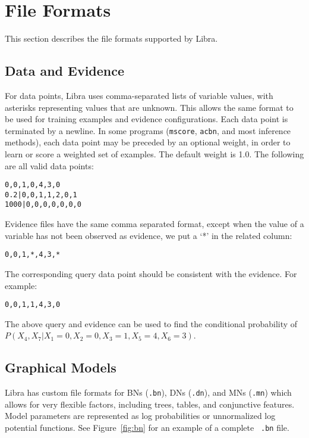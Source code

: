 \documentclass[11pt]{article}
\begin{document}
\section{File Formats}
\label{sec:fileformats}

This section describes the file formats supported by Libra.

\subsection{Data and Evidence}

For data points, Libra uses comma-separated lists of variable values,
with asterisks representing values that are unknown.  This allows the
same format to be used for training examples and evidence
configurations.  Each data point is terminated by a newline.  In some
programs ({\tt mscore}, {\tt acbn}, and most inference
methods), each data point may be preceded by an optional weight, in
order to learn or score a weighted set of examples.  The default
weight is 1.0.  The following are all valid data points:
\begin{verbatim}
0,0,1,0,4,3,0
0.2|0,0,1,1,2,0,1
1000|0,0,0,0,0,0,0
\end{verbatim}
Evidence files have the same comma separated format, except when the
value of a variable has not been observed as evidence, we put a `*'
in the related column:
\begin{verbatim}
0,0,1,*,4,3,*
\end{verbatim}
The corresponding query data point should be consistent with the evidence.
For example:
\begin{verbatim}
0,0,1,1,4,3,0
\end{verbatim}
The above query and evidence can be used to find the conditional probability of
$P(X_4, X_7 | X_1 = 0, X_2=0, X_3 = 1, X_5 = 4, X_6 = 3)$.


\subsection{Graphical Models}

Libra has custom file formats for BNs ({\tt .bn}), DNs ({\tt .dn}),
and MNs ({\tt .mn}) which allows for very flexible factors, including
trees, tables, and conjunctive features.  Model parameters are
represented as log probabilities or unnormalized log potential
functions.  See Figure~\ref{fig:bn} for an example of a complete {\tt
.bn} file.
\end{document}
